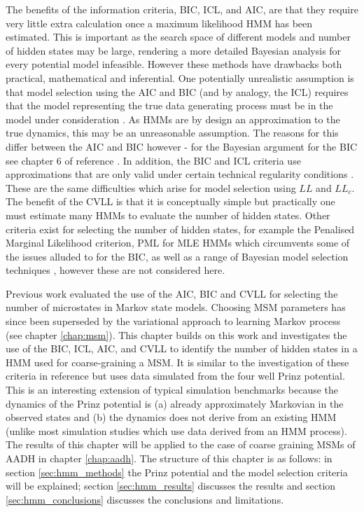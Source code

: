 The benefits of the information criteria, BIC, ICL, and AIC, are that they require  very little extra calculation once a maximum likelihood HMM has been estimated. This is important as the search space of different models and number of hidden states may be large, rendering a more detailed Bayesian analysis for every potential model infeasible. However these methods have drawbacks both practical, mathematical and inferential. One potentially unrealistic assumption is that model selection using the AIC and BIC (and by analogy, the ICL) requires that the model representing the true data generating process must be in the model under consideration \cite{ripley_1996}. As HMMs are by design an approximation to the true dynamics, this may be an unreasonable assumption. The reasons for this differ between the AIC and BIC however - for the Bayesian argument for the BIC see chapter 6 of reference \cite{bernardo2007bayesian}. In addition, the BIC and ICL criteria use approximations that are only valid under certain technical regularity conditions \cite{mclachlanFiniteMixtureModels2000}. These are the same difficulties which arise for  model selection using $LL$ and $LL_{c}$.  The benefit of the CVLL  is that it is conceptually simple but practically  one must estimate many HMMs to evaluate the number of hidden states. Other criteria exist for selecting the number of hidden states, for example the Penalised Marginal Likelihood criterion, PML \cite{gassiatLikelihoodRatioInequalities2002} for MLE HMMs which circumvents some of the issues alluded to for the BIC, as well as a range of Bayesian model selection techniques \cite{gelmanBayesianDataAnalysis2014,bernardo2007bayesian}, however these are not considered here. 

Previous work \cite{mcgibbonStatisticalModelSelection2014a} evaluated the use of the AIC, BIC and CVLL for selecting the number of microstates in Markov state models. Choosing MSM parameters has since been superseded by the variational approach to learning Markov process (see chapter \ref{chap:msm}). This chapter builds on this work and investigates the use of the BIC, ICL, AIC, and CVLL to identify the number of hidden states in a HMM used for coarse-graining a MSM. It is similar to the investigation of these criteria in reference \cite{celeuxSelectingHiddenMarkov2008} but uses data simulated from the four well Prinz potential. This is an interesting extension of typical simulation benchmarks because the dynamics of the Prinz potential is (a) already approximately Markovian in the observed states and (b) the dynamics does not derive from an existing HMM (unlike most simulation studies which use data derived from an HMM process). The results of this chapter will be applied to the case of coarse graining MSMs of AADH in chapter \ref{chap:aadh}.  The structure of this chapter is as follows: in section \ref{sec:hmm_methods} the Prinz potential and the model selection criteria will be explained; section \ref{sec:hmm_results} discusses the results and section \ref{sec:hmm_conclusions} discusses the conclusions and limitations.

